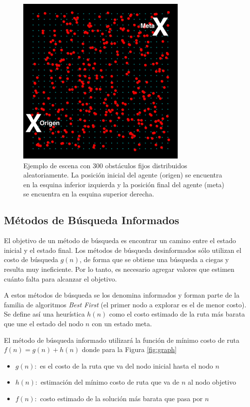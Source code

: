 \documentclass[a4paper,10pt]{article}
\begin{document}
\begin{figure}[H]
	\centering
    \includegraphics[width=0.75\textwidth]{images/scene.png}
    \caption{Ejemplo de escena con 300 obstáculos fijos distribuidos aleatoriamente. La posición inicial del agente (origen) se encuentra en la esquina inferior izquierda y la posición final del agente (meta) se encuentra en la esquina superior derecha.}
    \label{fig:scene}
\end{figure}

\subsection{Métodos de Búsqueda Informados}

El objetivo de un método de búsqueda es encontrar un camino entre el estado inicial y el estado final. Los métodos de búsqueda desinformados sólo utilizan el costo de búsqueda $g(n)$, de forma que se obtiene una búsqueda a ciegas y resulta muy ineficiente. Por lo tanto, es necesario agregar valores que estimen cuánto falta para alcanzar el objetivo. 

A estos métodos de búsqueda se los denomina informados y forman parte de la familia de algoritmos \textit{Best First} (el primer nodo a explorar es el de menor costo). Se define así una heurística $h(n)$ como el costo estimado de la ruta más barata que une el estado del nodo $n$ con un estado meta. 

El método de búsqueda informado utilizará la función de mínimo costo de ruta $f(n) = g(n) + h(n)$ donde para la Figura \ref{fig:graph}
	\begin{itemize}
		\item $g(n):$ es el costo de la ruta que va del nodo inicial hasta el nodo $n$
		\item $h(n):$ estimación del mínimo costo de ruta que va de $n$ al nodo objetivo
		\item $f(n):$ costo estimado de la solución más barata que pasa por $n$
	\end{itemize}
	
\end{document}
